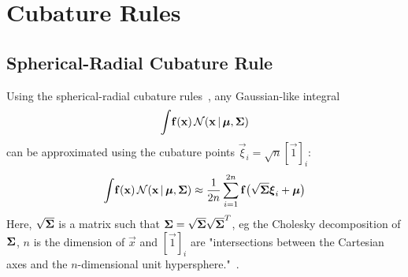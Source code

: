 \section{Cubature Rules}

\subsection{Spherical-Radial Cubature Rule}
	Using the spherical-radial cubature rules~\cite{solinCubatureIntegrationMethods2010}, any Gaussian-like integral
	\begin{equation*}
		\int\! \boldsymbol{\mathrm{f}}(\boldsymbol{\mathrm{x}}) \,\mathcal{N}(\boldsymbol{\mathrm{x}} \,\vert\, \boldsymbol{\mathrm{\mu}}, \boldsymbol{\mathrm{\Sigma}})
	\end{equation*}
	can be approximated using the cubature points \( \vec{\xi}_i = \sqrt{n} [\vec{1}]_i \):
	\begin{equation}
		\int\! \boldsymbol{\mathrm{f}}(\boldsymbol{\mathrm{x}}) \,\mathcal{N}(\boldsymbol{\mathrm{x}} \,\vert\, \boldsymbol{\mathrm{\mu}}, \boldsymbol{\mathrm{\Sigma}}) \approx \frac{1}{2n} \sum_{i = 1}^{2n} \boldsymbol{\mathrm{f}}\big( \sqrt{\boldsymbol{\mathrm{\Sigma}}} \boldsymbol{\mathrm{\xi}}_i + \boldsymbol{\mathrm{\mu}} \big)  \label{eq:sphericalRadialGaussianCubatureRule}
	\end{equation}
	Here, \( \sqrt{\boldsymbol{\mathrm{\Sigma}}} \) is a matrix such that \( \boldsymbol{\mathrm{\Sigma}} = \sqrt{\boldsymbol{\mathrm{\Sigma}}} \sqrt{\boldsymbol{\mathrm{\Sigma}}}^T \), \ac{eg} the Cholesky decomposition of \(\boldsymbol{\mathrm{\Sigma}}\), \(n\) is the dimension of \(\vec{x}\) and \( [\vec{1}]_i \) are "intersections between the Cartesian axes and the \(n\)-dimensional unit hypersphere."~\cite{solinCubatureIntegrationMethods2010}.
